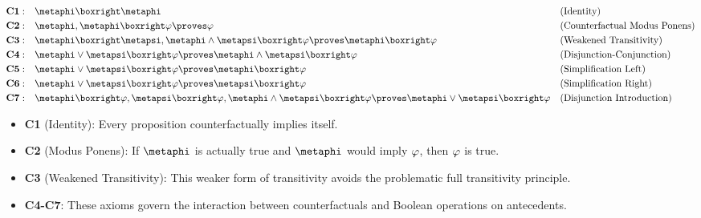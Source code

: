 \documentclass[../LogosReference.tex]{subfiles}
\begin{document}
\begin{definition}\label{def:counterfactual-axioms}
	\begin{align}
		\textbf{C1}: \quad & \metaphi \boxright \metaphi                                                                                                                    &  & \text{(Identity)}                    \\
		\textbf{C2}: \quad & \metaphi, \metaphi \boxright \metaA \proves \metaA                                                                                             &  & \text{(Counterfactual Modus Ponens)} \\
		\textbf{C3}: \quad & \metaphi \boxright \metapsi, \metaphi \land \metapsi \boxright \metaA \proves \metaphi \boxright \metaA                                        &  & \text{(Weakened Transitivity)}       \\
		\textbf{C4}: \quad & \metaphi \lor \metapsi \boxright \metaA \proves \metaphi \land \metapsi \boxright \metaA                                                       &  & \text{(Disjunction-Conjunction)}     \\
		\textbf{C5}: \quad & \metaphi \lor \metapsi \boxright \metaA \proves \metaphi \boxright \metaA                                                                      &  & \text{(Simplification Left)}         \\
		\textbf{C6}: \quad & \metaphi \lor \metapsi \boxright \metaA \proves \metapsi \boxright \metaA                                                                      &  & \text{(Simplification Right)}        \\
		\textbf{C7}: \quad & \metaphi \boxright \metaA, \metapsi \boxright \metaA, \metaphi \land \metapsi \boxright \metaA \proves \metaphi \lor \metapsi \boxright \metaA &  & \text{(Disjunction Introduction)}
	\end{align}
\end{definition}

\begin{remark}
	\begin{itemize}
		\item \textbf{C1} (Identity): Every proposition counterfactually implies itself.
		\item \textbf{C2} (Modus Ponens): If $\metaphi$ is actually true and $\metaphi$ would imply $\varphi$, then $\varphi$ is true.
		\item \textbf{C3} (Weakened Transitivity): This weaker form of transitivity avoids the problematic full transitivity principle.
		\item \textbf{C4-C7}: These axioms govern the interaction between counterfactuals and Boolean operations on antecedents.
	\end{itemize}
\end{remark}
\end{document}
